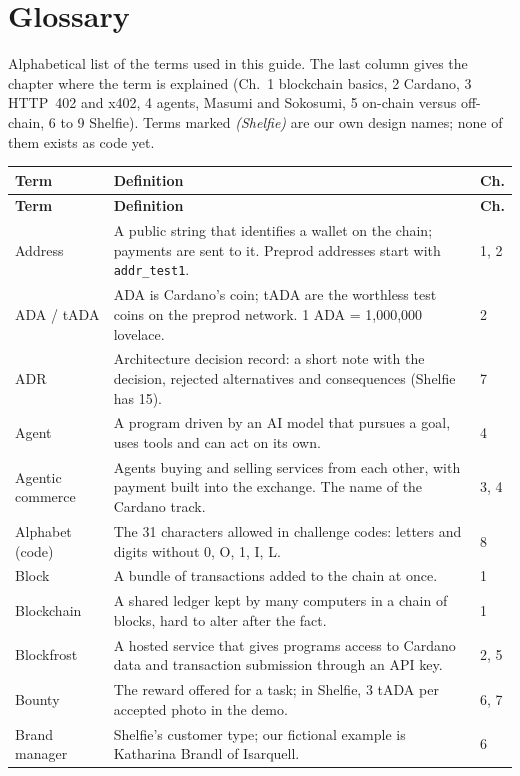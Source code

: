 \chapter{Glossary}

Alphabetical list of the terms used in this guide. The last column gives the chapter where the term is explained (Ch.~1 blockchain basics, 2 Cardano, 3 HTTP~402 and x402, 4 agents, Masumi and Sokosumi, 5 on-chain versus off-chain, 6 to 9 Shelfie). Terms marked \emph{(Shelfie)} are our own design names; none of them exists as code yet.

{\small
\renewcommand{\arraystretch}{1.12}
\begin{longtable}{@{}p{3.4cm}p{10.6cm}p{1.2cm}@{}}
\toprule
\textbf{Term} & \textbf{Definition} & \textbf{Ch.}\\
\midrule
\endfirsthead
\toprule
\textbf{Term} & \textbf{Definition} & \textbf{Ch.}\\
\midrule
\endhead
\bottomrule
\endfoot
Address & A public string that identifies a wallet on the chain; payments are sent to it. Preprod addresses start with \texttt{addr\_test1}. & 1, 2\\
ADA / tADA & ADA is Cardano's coin; tADA are the worthless test coins on the preprod network. 1 ADA = 1,000,000 lovelace. & 2\\
ADR & Architecture decision record: a short note with the decision, rejected alternatives and consequences (Shelfie has 15). & 7\\
Agent & A program driven by an AI model that pursues a goal, uses tools and can act on its own. & 4\\
Agentic commerce & Agents buying and selling services from each other, with payment built into the exchange. The name of the Cardano track. & 3, 4\\
Alphabet (code) & The 31 characters allowed in challenge codes: letters and digits without 0, O, 1, I, L. & 8\\
Block & A bundle of transactions added to the chain at once. & 1\\
Blockchain & A shared ledger kept by many computers in a chain of blocks, hard to alter after the fact. & 1\\
Blockfrost & A hosted service that gives programs access to Cardano data and transaction submission through an API key. & 2, 5\\
Bounty & The reward offered for a task; in Shelfie, 3 tADA per accepted photo in the demo. & 6, 7\\
Brand manager & Shelfie's customer type; our fictional example is Katharina Brandl of Isarquell. & 6\\

\end{longtable}}

